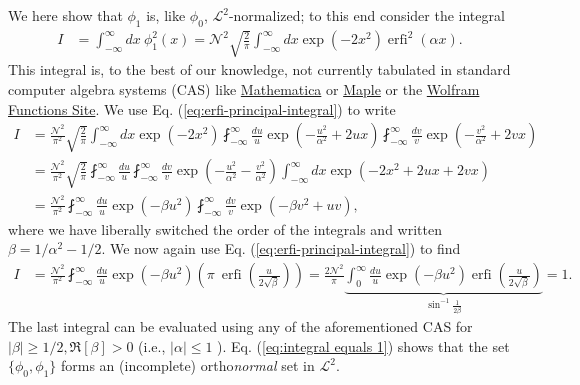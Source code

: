 \documentclass[english,12pt]{shreyasnotes}
\newcommand{\eq}[1]{\begin{align}#1\end{align}}
\DeclareMathOperator{\erfi}{erfi}
\begin{document}
We here show that $\phi_1$ is, like $\phi_0$, $\mathcal{L}^2$-normalized; to this end consider the integral
\eq{
  I&=\int_{-\infty}^\infty dx \ \phi_1^2\left(x\right) =\mathcal{N}^2\sqrt{\frac{2}{\pi}}\int_{-\infty}^\infty dx  \exp\left(-2x^2\right)\erfi^2\left(\alpha x\right).
}
This integral is, to the best of our knowledge, not currently tabulated in standard computer algebra systems (CAS) like \href{http://www.wolfram.com/mathematica/}{Mathematica} or \href{http://www.maplesoft.com/}{Maple} or the \href{http://functions.wolfram.com/GammaBetaErf/Erfi/}{Wolfram Functions Site}. 
We use Eq. (\ref{eq:erfi-principal-integral}) to write
\begin{subequations}
\eq{
  I&=\frac{\mathcal{N}^2}{\pi^2}\sqrt{\frac{2}{\pi}}\int_{-\infty}^\infty dx\exp\left(-2x^2\right)\fint_{-\infty}^\infty \frac{du}{u} \exp\left(-\frac{u^2}{\alpha^2}+2ux\right)\fint_{-\infty}^\infty \frac{dv}{v} \exp\left(-\frac{v^2}{\alpha^2}+2vx\right)\\
  &=\frac{\mathcal{N}^2}{\pi^2}\sqrt{\frac{2}{\pi}}\fint_{-\infty}^\infty \frac{du}{u}\fint_{-\infty}^\infty \frac{dv}{v}
  \exp\left(-\frac{u^2}{\alpha^2}-\frac{v^2}{\alpha^2}\right) \int_{-\infty}^\infty dx \exp\left(-2x^2+2ux+2vx\right)\\
  &=\frac{\mathcal{N}^2}{\pi^2}\fint_{-\infty}^\infty \frac{du}{u}\exp\left(-\beta u^2\right)\fint_{-\infty}^\infty \frac{dv}{v}
  \exp\left(-\beta v^2+uv\right),
}
\end{subequations}
where we have liberally switched the order of the integrals and written $\beta=1/\alpha^2-1/2$. We now again use Eq. (\ref{eq:erfi-principal-integral}) to find
\eq{
  I&=\frac{\mathcal{N}^2}{\pi^2}\fint_{-\infty}^\infty \frac{du}{u}\exp\left(-\beta u^2\right)\left(\pi \ \erfi\left(\frac{u}{2\sqrt{\beta}}\right)\right)
  =\frac{2\mathcal{N}^2}{\pi}\underbrace{\int_{0}^\infty \frac{du}{u}\exp\left(-\beta u^2\right)\erfi\left(\frac{u}{2\sqrt{\beta}}\right)}_{\sin^{-1}\frac{1}{2\beta}}
  =1.
  \label{eq:integral equals 1}
}
The last integral can be evaluated using any of the aforementioned CAS for $\left|\beta\right|\geq1/2,\Re\left[\beta\right]>0$ (i.e., $\left|\alpha\right|\leq 1$%
). Eq. (\ref{eq:integral equals 1}) shows that the set $\{\phi_0,\phi_1 \}$ forms an (incomplete) ortho\emph{normal} set in $\mathcal{L}^2$.
\end{document}
